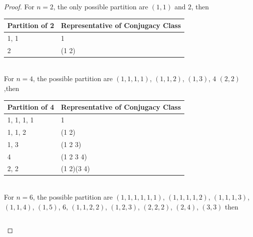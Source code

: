 \documentclass{article}
\begin{document}
\begin{proof}
    For $n=2$, the only possible partition are $(1, 1)$ and $2$, then 
    \begin{table}[h!]
    \centering

    \begin{tabular}{l|l}

        \textbf{Partition of 2} & \textbf{Representative of Conjugacy Class} \\ \hline
        1, 1 & 1\\
        2 & (1 2)
    \end{tabular}
\end{table}\\
For $n=4$, the possible partition are $(1, 1, 1, 1)$, $(1, 1, 2)$, $(1, 3)$, $4$ $(2, 2)$,then 
    \begin{table}[h!]
    \centering

    \begin{tabular}{l|l}

        \textbf{Partition of 4} & \textbf{Representative of Conjugacy Class} \\ \hline
        1, 1, 1, 1 & 1\\
        1, 1, 2 & (1 2)\\
        1, 3 & (1 2 3)\\
        4 & (1 2 3 4)\\
        2, 2 & (1 2)(3 4)\\
    \end{tabular}
\end{table}\\
For $n=6$, the possible partition are $(1, 1, 1, 1, 1, 1)$, $(1, 1, 1, 1, 2)$, $(1, 1, 1, 3)$, $(1, 1, 4)$, $(1, 5)$, $6$, $(1, 1, 2, 2)$, $(1, 2, 3)$, $(2, 2, 2)$, $(2, 4)$, $(3, 3)$ then 
    \begin{table}[h!]
    \centering

    \begin{tabular}{l|l}


\end{tabular}
\end{table}
\end{proof}
\end{document}
